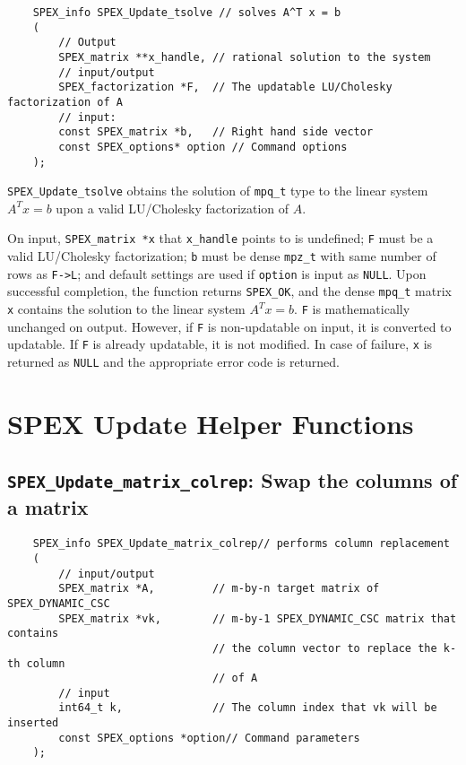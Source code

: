 \documentclass[12pt]{report}
\theoremstyle{definition}
\begin{document}
{\begin{mdframed}[userdefinedwidth=6in]
{\footnotesize
\begin{verbatim}
    SPEX_info SPEX_Update_tsolve // solves A^T x = b
    (
        // Output
        SPEX_matrix **x_handle, // rational solution to the system
        // input/output
        SPEX_factorization *F,  // The updatable LU/Cholesky factorization of A
        // input:
        const SPEX_matrix *b,   // Right hand side vector
        const SPEX_options* option // Command options
    );
\end{verbatim}
} \end{mdframed}


\verb|SPEX_Update_tsolve| obtains the solution of \verb|mpq_t| type to the
linear system $A^Tx=b$ upon a valid LU/Cholesky factorization of $A$.

On input, \verb|SPEX_matrix *x| that \verb|x_handle| points to is undefined; \verb|F| must be a valid LU/Cholesky factorization; \verb|b| must be dense \verb|mpz_t| with same number of rows as \verb|F->L|; and default settings are used if
\verb|option| is input as \verb|NULL|. Upon successful completion, the function returns \verb|SPEX_OK|, and the dense \verb|mpq_t| matrix \verb|x|
contains the solution   to the linear
system $A^Tx=b$. \verb|F| is mathematically unchanged on output. However, if \verb|F| is non-updatable on input, it is converted to updatable. If \verb|F| is already updatable, it is not modified.
In case of failure, \verb|x| is returned as \verb|NULL| and the appropriate error code is returned.


\section {SPEX Update Helper Functions}
\subsection{\texttt{SPEX\_Update\_matrix\_colrep}: Swap the columns of a matrix}\label{ss:SPEX_Update_matrix_colrep}

\begin{mdframed}[userdefinedwidth=6in]
{\footnotesize
\begin{verbatim}
    SPEX_info SPEX_Update_matrix_colrep// performs column replacement
    (
        // input/output
        SPEX_matrix *A,         // m-by-n target matrix of SPEX_DYNAMIC_CSC
        SPEX_matrix *vk,        // m-by-1 SPEX_DYNAMIC_CSC matrix that contains
                                // the column vector to replace the k-th column
                                // of A
        // input
        int64_t k,              // The column index that vk will be inserted
        const SPEX_options *option// Command parameters
    );
\end{verbatim}
} \end{mdframed}

}
\end{document}
